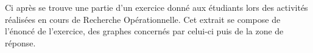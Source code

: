 Ci après se trouve une partie d'un exercice donné aux étudiants lors des activités réalisées en cours de Recherche Opérationnelle. Cet extrait se compose de l'énoncé de l'exercice, des graphes concernés par celui-ci puis de la zone de réponse.

